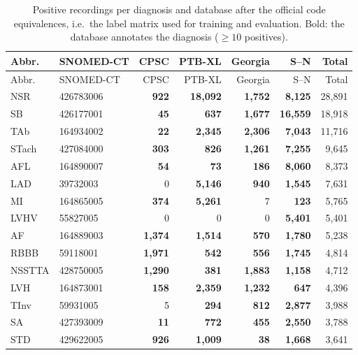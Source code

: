 \begin{longtable}{@{}llrrrrr@{}}
\caption{Positive recordings per diagnosis and database after the official code equivalences, i.e.\ the label matrix used for training and evaluation. Bold: the database annotates the diagnosis ($\geq10$ positives).}\label{tab:counts}\\
\toprule Abbr. & SNOMED-CT & CPSC & PTB-XL & Georgia & S--N & Total \\ \midrule \endfirsthead
\toprule Abbr. & SNOMED-CT & CPSC & PTB-XL & Georgia & S--N & Total \\ \midrule \endhead
\bottomrule \endfoot
NSR & 426783006 & \textbf{922} & \textbf{18{,}092} & \textbf{1{,}752} & \textbf{8{,}125} & 28{,}891 \\
SB & 426177001 & \textbf{45} & \textbf{637} & \textbf{1{,}677} & \textbf{16{,}559} & 18{,}918 \\
TAb & 164934002 & \textbf{22} & \textbf{2{,}345} & \textbf{2{,}306} & \textbf{7{,}043} & 11{,}716 \\
STach & 427084000 & \textbf{303} & \textbf{826} & \textbf{1{,}261} & \textbf{7{,}255} & 9{,}645 \\
AFL & 164890007 & \textbf{54} & \textbf{73} & \textbf{186} & \textbf{8{,}060} & 8{,}373 \\
LAD & 39732003 & 0 & \textbf{5{,}146} & \textbf{940} & \textbf{1{,}545} & 7{,}631 \\
MI & 164865005 & \textbf{374} & \textbf{5{,}261} & 7 & \textbf{123} & 5{,}765 \\
LVHV & 55827005 & 0 & 0 & 0 & \textbf{5{,}401} & 5{,}401 \\
AF & 164889003 & \textbf{1{,}374} & \textbf{1{,}514} & \textbf{570} & \textbf{1{,}780} & 5{,}238 \\
RBBB & 59118001 & \textbf{1{,}971} & \textbf{542} & \textbf{556} & \textbf{1{,}745} & 4{,}814 \\
NSSTTA & 428750005 & \textbf{1{,}290} & \textbf{381} & \textbf{1{,}883} & \textbf{1{,}158} & 4{,}712 \\
LVH & 164873001 & \textbf{158} & \textbf{2{,}359} & \textbf{1{,}232} & \textbf{647} & 4{,}396 \\
TInv & 59931005 & 5 & \textbf{294} & \textbf{812} & \textbf{2{,}877} & 3{,}988 \\
SA & 427393009 & \textbf{11} & \textbf{772} & \textbf{455} & \textbf{2{,}550} & 3{,}788 \\
STD & 429622005 & \textbf{926} & \textbf{1{,}009} & \textbf{38} & \textbf{1{,}668} & 3{,}641 \\

\end{longtable}
